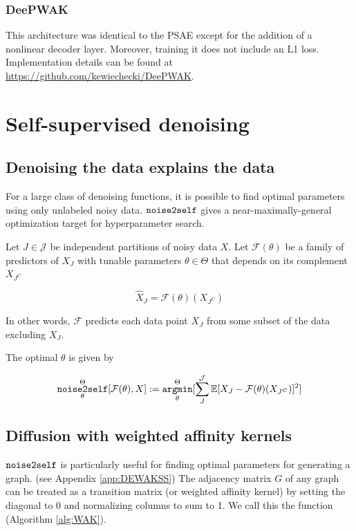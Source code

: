 \subsubsection{DeePWAK}
This architecture was identical to the PSAE except for the addition of a nonlinear decoder layer.
Moreover, training it does not include an \textsf{L1} loss.
Implementation details can be found at 
\url{https://github.com/kewiechecki/DeePWAK}.

\section{Self-supervised denoising}
\label{app:bgd}

\subsection{Denoising the data explains the data}
\label{app:ntos}
For a large class of denoising functions, it is possible to find optimal parameters using only unlabeled noisy data\cite{batson2019noise2self}.
$\mathop{\mathtt{noise2self}}\limits$ gives a near-maximally-general optimization target for hyperparameter search.


Let $J \in \mathcal{J}$ be independent partitions of noisy data $X$.
Let $\mathcal{F}(\theta)$ be a family of predictors of $X_J$ with tunable parameters
$\theta \in \Theta$ that depends on its complement $X_{J^C}$

\begin{equation}
  \hat{X}_J=\mathcal{F}(\theta)(X_{J^C})
\end{equation}

In other words, $\mathcal{F}$ predicts each data point $X_J$ from some subset of the data excluding $X_J$. 

  The optimal $\theta$ is given by

\begin{equation}
  \label{eq:ntos}
  \mathop{\mathtt{noise2self}}\limits_\theta^{\Theta}[\mathcal{F}(\theta),X] := \mathop{\mathtt{argmin}}\limits_\theta^{\Theta}[\sum_{J}^{\mathcal{J}}\mathbb{E}[X_J-\mathcal{F}(\theta)(X_{J^C})]^2]
\end{equation}

\subsection{Diffusion with weighted affinity kernels}

$\mathop{\mathtt{noise2self}}\limits$ is particularly useful for finding optimal parameters for generating a graph\cite{tjarnberg2021}.
(see Appendix \ref{app:DEWAKSS})
The adjacency matrix $G$ of any graph can be treated as a transition matrix (or weighted affinity kernel) by setting the diagonal to 0 and normalizing columns to sum to 1. We call this the \WAK function (Algorithm \ref{alg:WAK}).

